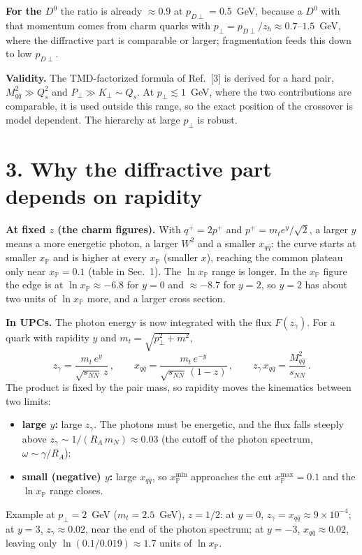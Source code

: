 \documentclass[12pt]{article}
\newcommand{\xpo}{x_{\mathbb{P}}}
\begin{document}
\textbf{For the $D^0$} the ratio is already $\approx0.9$ at $p_{D\perp}=0.5$~GeV, because a $D^0$ with
that momentum comes from charm quarks with $p_\perp=p_{D\perp}/z_h\approx0.7$--$1.5$~GeV, where the
diffractive part is comparable or larger; fragmentation feeds this down to low $p_{D\perp}$.

\textbf{Validity.} The TMD-factorized formula of Ref.~[3] is derived for a hard pair,
$M_{q\bar q}^2\gg Q_s^2$ and $P_\perp\gg K_\perp\sim Q_s$. At $p_\perp\lesssim1$~GeV, where the two
contributions are comparable, it is used outside this range, so the exact position of the crossover
is model dependent. The hierarchy at large $p_\perp$ is robust.

\section*{3. Why the diffractive part depends on rapidity}

\textbf{At fixed $z$ (the charm figures).} With $q^+=2p^+$ and $p^+=m_te^y/\sqrt2$, a larger $y$ means
a more energetic photon, a larger $W^2$ and a smaller $x_{q\bar q}$: the curve starts at smaller
$\xpo$ and is higher at every $\xpo$ (smaller $x$), reaching the common plateau only near
$\xpo=0.1$ (table in Sec.~1). The $\ln\xpo$ range is longer. In the $\xpo$ figure the edge is at
$\ln\xpo\approx-6.8$ for $y=0$ and $\approx-8.7$ for $y=2$, so $y=2$ has about two units of
$\ln\xpo$ more, and a larger cross section.

\textbf{In UPCs.} The photon energy is now integrated with the flux $F(z_\gamma)$. For a quark
with rapidity $y$ and $m_t=\sqrt{p_\perp^2+m^2}$,
\[
  z_\gamma=\frac{m_t\,e^{y}}{\sqrt{s_{NN}}\,z}\,,\qquad
  x_{q\bar q}=\frac{m_t\,e^{-y}}{\sqrt{s_{NN}}\,(1-z)}\,,\qquad
  z_\gamma\,x_{q\bar q}=\frac{M_{q\bar q}^2}{s_{NN}}\,.
\]
The product is fixed by the pair mass, so rapidity moves the kinematics between two limits:
\begin{itemize}
\item \textbf{large $y$:} large $z_\gamma$. The photons must be energetic, and the flux falls steeply
  above $z_\gamma\sim1/(R_A\,m_N)\approx0.03$ (the cutoff of the photon spectrum, $\omega\sim\gamma/R_A$);
\item \textbf{small (negative) $y$:} large $x_{q\bar q}$, so $\xpo^{\min}$ approaches the cut
  $\xpo^{\max}=0.1$ and the $\ln\xpo$ range closes.
\end{itemize}
Example at $p_\perp=2$~GeV ($m_t=2.5$~GeV), $z=1/2$: at $y=0$, $z_\gamma=x_{q\bar q}\approx9\times10^{-4}$;
at $y=3$, $z_\gamma\approx0.02$, near the end of the photon spectrum; at $y=-3$,
$x_{q\bar q}\approx0.02$, leaving only $\ln(0.1/0.019)\approx1.7$ units of $\ln\xpo$.
\end{document}

